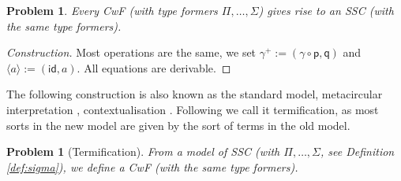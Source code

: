 \documentclass[submission,copyright,creativecommons]{eptcs}
\newtheorem{problem}[theorem]{Problem}
\newcommand{\p}{\mathsf{p}}
\newcommand{\q}{\mathsf{q}}
\newcommand{\id}{\mathsf{id}}
\begin{document}
\begin{problem}
  Every CwF (with type formers $\Pi, \dots, \Sigma$) gives rise to an SSC (with
  the same type formers).
\end{problem}
\begin{proof}[Construction]
  Most operations are the same, we set $\gamma^+ :=
  (\gamma\circ\p,\q)$ and $\langle a\rangle := (\id,a)$. All equations are derivable.
\end{proof}
The following construction is also known as the standard model,
metacircular interpretation \cite{DBLP:conf/popl/AltenkirchK16},
contextualisation \cite{DBLP:conf/fscd/BocquetKS23}. Following
\cite{kaposi-shallow} we call it termification, as most sorts in the
new model are given by the sort of terms in the old model.
\begin{problem}[Termification]\label{prob:termification}
  From a model of SSC (with $\Pi, \dots, \Sigma$, see Definition
  \ref{def:sigma}), we define a CwF (with the same type formers).
\end{problem}
\end{document}
